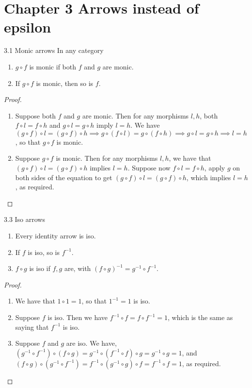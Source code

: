 \section*{Chapter 3 Arrows instead of epsilon}

\begin{exercise}{3.1 Monic arrows}
In any category 
\begin{enumerate}
    \item $g\circ f$ is monic if both $f$ and $g$ are monic.
    \item If $g\circ f$ is monic, then so is $f$.
\end{enumerate}
\end{exercise}
\begin{proof}
 \begin{enumerate}
     \item Suppose both $f$ and $g$ are monic. Then for any morphisms $l, h$, both $f\circ l = f\circ h$ and $g\circ l= g\circ h$ imply $l=h$. We have $(g\circ f) \circ l = (g\circ f) \circ h\implies g\circ (f\circ l) = g\circ(f \circ h) \implies g \circ l = g\circ h\implies l=h$, so that $g\circ f$ is monic.
     \item Suppose $g\circ f$ is monic. Then for any morphisms $l, h$, we have that $(g\circ f)\circ l=(g\circ f)\circ h$ implies $l=h$. Suppose now $f\circ l=f\circ h$, apply $g$ on both sides of the equation to get $(g\circ f)\circ l=(g\circ f)\circ h$, which implies $l=h$, as required.
 \end{enumerate}
\end{proof}

\begin{exercise}{3.3 Iso arrows}
\begin{enumerate}
    \item Every identity arrow is iso.
    \item If $f$ is iso, so is $f^{-1}$.
    \item $f\circ g$ is iso if $f, g$ are, with $(f\circ g)^{-1}=g^{-1}\circ f^{-1}$. 
\end{enumerate}
\end{exercise}
\begin{proof}
 \begin{enumerate}
     \item We have that $1\circ 1=1$, so that $1^{-1}=1$ is iso.
     \item Suppose $f$ is iso. Then we have $f^{-1}\circ f= f\circ f^{-1}=1$, which is the same as saying that $f^{-1}$ is iso.
     \item Suppose $f$ and $g$ are iso. We have, $(g^{-1}\circ f^{-1})\circ(f\circ g)= g^{-1}\circ (f^{-1}\circ f)\circ g= g^{-1}\circ g= 1$, and $(f\circ g)\circ(g^{-1}\circ f^{-1})= f^{-1}\circ (g^{-1}\circ g)\circ f= f^{-1}\circ f= 1$, as required.
 \end{enumerate}
\end{proof}

